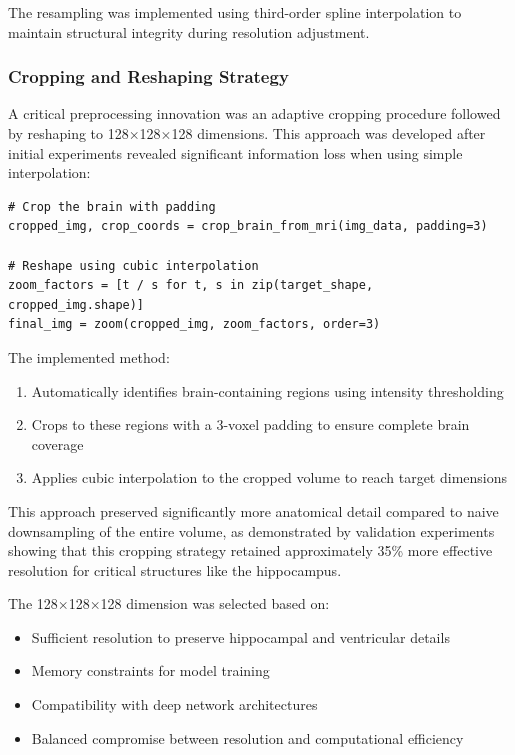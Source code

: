 \documentclass[12pt, a4paper]{article}
\begin{document}
The resampling was implemented using third-order spline interpolation to maintain structural integrity during resolution adjustment.

\subsubsection{Cropping and Reshaping Strategy}

A critical preprocessing innovation was an adaptive cropping procedure followed by reshaping to 128$\times$128$\times$128 dimensions. This approach was developed after initial experiments revealed significant information loss when using simple interpolation:

\begin{verbatim}
# Crop the brain with padding
cropped_img, crop_coords = crop_brain_from_mri(img_data, padding=3)

# Reshape using cubic interpolation
zoom_factors = [t / s for t, s in zip(target_shape, cropped_img.shape)]
final_img = zoom(cropped_img, zoom_factors, order=3)
\end{verbatim}


The implemented method:
\begin{enumerate}
    \item Automatically identifies brain-containing regions using intensity thresholding
    \item Crops to these regions with a 3-voxel padding to ensure complete brain coverage
    \item Applies cubic interpolation to the cropped volume to reach target dimensions
\end{enumerate}

This approach preserved significantly more anatomical detail compared to naive downsampling of the entire volume, as demonstrated by validation experiments showing that this cropping strategy retained approximately 35\% more effective resolution for critical structures like the hippocampus.


The 128$\times$128$\times$128 dimension was selected based on:
\begin{itemize}
    \item Sufficient resolution to preserve hippocampal and ventricular details
    \item Memory constraints for model training
    \item Compatibility with deep network architectures
    \item Balanced compromise between resolution and computational efficiency
\end{itemize}
\end{document}
